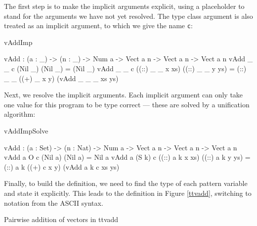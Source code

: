 The first step is to make the implicit arguments explicit, using a placeholder
to stand for the arguments we have not yet resolved. The type class argument is
also treated as an implicit argument, to which we give the name \texttt{c}:

\begin{SaveVerbatim}{vAddImp}

vAdd : (a : _) -> (n : _) -> Num a -> Vect a n -> Vect a n -> Vect a n
vAdd _ _ c (Nil _)         (Nil _)         = (Nil _)
vAdd _ _ c ((::) _ _ x xs) ((::) _ _ y ys) 
                = (::) _ _ ((+) _ x y) (vAdd _ _ _ xs ys)

\end{SaveVerbatim}

Next, we resolve the implicit arguments. Each implicit argument can only take
one value for this program to be type correct --- these are solved by a unification
algorithm:

\begin{SaveVerbatim}{vAddImpSolve}

vAdd : (a : Set) -> (n : Nat) -> Num a -> Vect a n -> Vect a n -> Vect a n
vAdd a O     c (Nil a)         (Nil a)         = Nil a
vAdd a (S k) c ((::) a k x xs) ((::) a k y ys) 
                = (::) a k ((+) c x y) (vAdd a k c xs ys)

\end{SaveVerbatim}

Finally, to build the \TT{} definition, we need to find the type of each pattern variable
and state it explicitly. This leads to the \TT{} definition in Figure \ref{ttvadd}, 
switching to \TT{} notation from the ASCII \Idris{} syntax.

{Pairwise addition of vectors in \TT{}}
{ttvadd}

